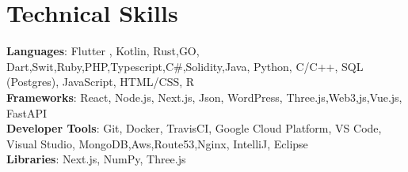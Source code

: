 \documentclass[letterpaper,11pt]{article}
\begin{document}
%
\section{Technical Skills}
 \begin{itemize}[leftmargin=0.15in, label={}]
    \small{\item{
     \textbf{Languages}{: Flutter , Kotlin, Rust,GO, Dart,Swit,Ruby,PHP,Typescript,C#,Solidity,Java, Python, C/C++, SQL (Postgres), JavaScript, HTML/CSS, R} \\
     \textbf{Frameworks}{: React, Node.js, Next.js, Json, WordPress, Three.js,Web3,js,Vue.js, FastAPI} \\
     \textbf{Developer Tools}{: Git, Docker, TravisCI, Google Cloud Platform, VS Code, Visual Studio, MongoDB,Aws,Route53,Nginx, IntelliJ, Eclipse} \\
     \textbf{Libraries}{: Next.js, NumPy, Three.js}
    }}
 \end{itemize}


\end{document}
